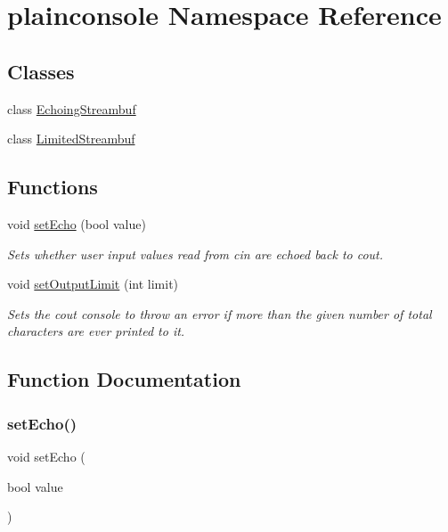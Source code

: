 \hypertarget{namespaceplainconsole}{}\section{plainconsole Namespace Reference}
\label{namespaceplainconsole}
\subsection*{Classes}
\begin{DoxyCompactItemize}
\item 
class \mbox{\hyperlink{classplainconsole_1_1EchoingStreambuf}{Echoing\+Streambuf}}
\item 
class \mbox{\hyperlink{classplainconsole_1_1LimitedStreambuf}{Limited\+Streambuf}}
\end{DoxyCompactItemize}
\subsection*{Functions}
\begin{DoxyCompactItemize}
\item 
void \mbox{\hyperlink{namespaceplainconsole_ab5c6852f3043d19153277c58603ee1e8}{set\+Echo}} (bool value)
\begin{DoxyCompactList}\small\item\em Sets whether user input values read from cin are echoed back to cout. \end{DoxyCompactList}\item 
void \mbox{\hyperlink{namespaceplainconsole_a95494ab13d3acc239eda093a209f4db4}{set\+Output\+Limit}} (int limit)
\begin{DoxyCompactList}\small\item\em Sets the cout console to throw an error if more than the given number of total characters are ever printed to it. \end{DoxyCompactList}\end{DoxyCompactItemize}


\subsection{Function Documentation}
\mbox{\label{namespaceplainconsole_ab5c6852f3043d19153277c58603ee1e8}} 
\subsubsection{\texorpdfstring{set\+Echo()}{setEcho()}}
{\footnotesize\ttfamily void set\+Echo (\begin{DoxyParamCaption}\item[{bool}]{value }\end{DoxyParamCaption})}



